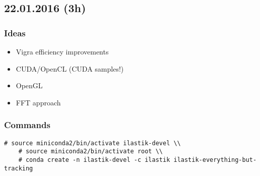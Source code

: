 \documentclass[12pt,a4paper]{article}
\begin{document}
\subsection{22.01.2016 (3h)}

  \subsubsection{Ideas}
    \begin{itemize}
      \item Vigra efficiency improvements
      \item CUDA/OpenCL (CUDA samples!)
      \item OpenGL
      \item FFT approach
    \end{itemize}

  \subsubsection{Commands}

    \begin{lstlisting}[style=BashInputStyle]
    # source miniconda2/bin/activate ilastik-devel \\
    # source miniconda2/bin/activate root \\
    # conda create -n ilastik-devel -c ilastik ilastik-everything-but-tracking
    \end{lstlisting}
\end{document}
